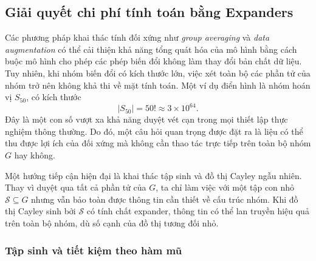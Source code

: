 \subsection{Giải quyết chi phí tính toán bằng Expanders}
\label{subsec:expanders}

Các phương pháp khai thác tính đối xứng như \textit{group averaging} và \textit{data augmentation} có thể cải thiện khả năng tổng quát hóa của mô hình bằng cách buộc mô hình cho phép các phép biến đổi không làm thay đổi bản chất dữ liệu. Tuy nhiên, khi nhóm biến đổi có kích thước lớn, việc xét toàn bộ các phần tử của nhóm trở nên không khả thi về mặt tính toán. Một ví dụ điển hình là nhóm hoán vị $S_{50}$, có kích thước
\begin{equation}
    |S_{50}| = 50! \approx 3 \times 10^{64}.
    \label{eq:s50-size}
\end{equation}
Đây là một con số vượt xa khả năng duyệt vét cạn trong mọi thiết lập thực nghiệm thông thường. Do đó, một câu hỏi quan trọng được đặt ra là liệu có thể thu được lợi ích của đối xứng mà không cần thao tác trực tiếp trên toàn bộ nhóm $G$ hay không.

Một hướng tiếp cận hiện đại là khai thác tập sinh và đồ thị Cayley ngẫu nhiên. Thay vì duyệt qua tất cả phần tử của $G$, ta chỉ làm việc với một tập con nhỏ $\mathcal{S} \subseteq G$ nhưng vẫn bảo toàn được thông tin cần thiết về cấu trúc nhóm. Khi đồ thị Cayley sinh bởi $\mathcal{S}$ có tính chất expander, thông tin có thể lan truyền hiệu quả trên toàn bộ nhóm, dù số cạnh của đồ thị tương đối nhỏ.

\subsubsection{Tập sinh và tiết kiệm theo hàm mũ}

